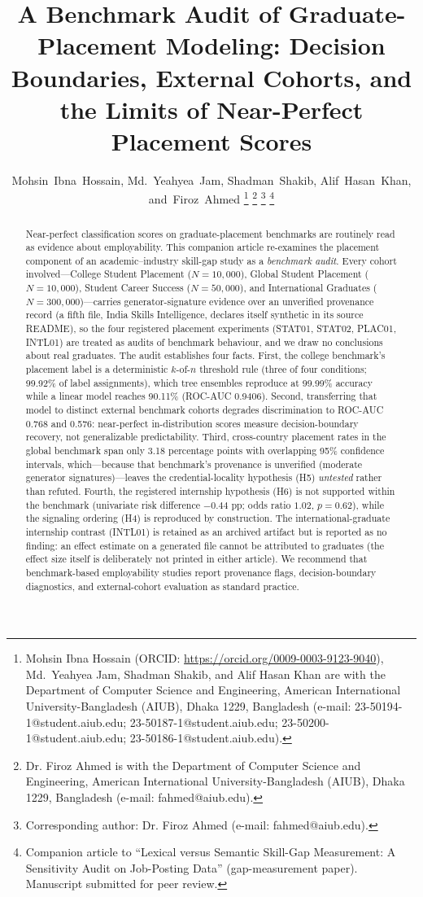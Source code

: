 \documentclass[journal]{IEEEtran}
\title{A Benchmark Audit of Graduate-Placement Modeling: Decision Boundaries, External Cohorts, and the Limits of Near-Perfect Placement Scores}
\author{Mohsin~Ibna~Hossain,
        Md.~Yeahyea~Jam,
        Shadman~Shakib,
        Alif~Hasan~Khan,
        and~Firoz~Ahmed%
\thanks{Mohsin Ibna Hossain (ORCID: \url{https://orcid.org/0009-0003-9123-9040}), Md.~Yeahyea Jam, Shadman Shakib, and Alif Hasan Khan are with the Department of Computer Science and Engineering, American International University-Bangladesh (AIUB), Dhaka 1229, Bangladesh (e-mail: 23-50194-1@student.aiub.edu; 23-50187-1@student.aiub.edu; 23-50200-1@student.aiub.edu; 23-50186-1@student.aiub.edu).}%
\thanks{Dr. Firoz Ahmed is with the Department of Computer Science and Engineering, American International University-Bangladesh (AIUB), Dhaka 1229, Bangladesh (e-mail: fahmed@aiub.edu).}%
\thanks{Corresponding author: Dr. Firoz Ahmed (e-mail: fahmed@aiub.edu).}%
\thanks{Companion article to ``Lexical versus Semantic Skill-Gap Measurement: A Sensitivity Audit on Job-Posting Data'' (gap-measurement paper). Manuscript submitted for peer review.}
}
\begin{document}
\maketitle

\begin{abstract}
Near-perfect classification scores on graduate-placement benchmarks are routinely read as evidence about employability. This companion article re-examines the placement component of an academic--industry skill-gap study as a \textit{benchmark audit}. Every cohort involved---College Student Placement ($N = 10{,}000$), Global Student Placement ($N = 10{,}000$), Student Career Success ($N = 50{,}000$), and International Graduates ($N = 300{,}000$)---carries generator-signature evidence over an unverified provenance record (a fifth file, India Skills Intelligence, declares itself synthetic in its source README), so the four registered placement experiments (STAT01, STAT02, PLAC01, INTL01) are treated as audits of benchmark behaviour, and we draw no conclusions about real graduates. The audit establishes four facts. First, the college benchmark's placement label is a deterministic $k$-of-$n$ threshold rule (three of four conditions; 99.92\% of label assignments), which tree ensembles reproduce at 99.99\% accuracy while a linear model reaches 90.11\% (ROC-AUC 0.9406). Second, transferring that model to distinct external benchmark cohorts degrades discrimination to ROC-AUC 0.768 and 0.576: near-perfect in-distribution scores measure decision-boundary recovery, not generalizable predictability. Third, cross-country placement rates in the global benchmark span only 3.18 percentage points with overlapping 95\% confidence intervals, which---because that benchmark's provenance is unverified (moderate generator signatures)---leaves the credential-locality hypothesis (H5) \textit{untested} rather than refuted. Fourth, the registered internship hypothesis (H6) is not supported within the benchmark (univariate risk difference $-0.44$ pp; odds ratio $1.02$, $p = 0.62$), while the signaling ordering (H4) is reproduced by construction. The international-graduate internship contrast (INTL01) is retained as an archived artifact but is reported as no finding: an effect estimate on a generated file cannot be attributed to graduates (the effect size itself is deliberately not printed in either article). We recommend that benchmark-based employability studies report provenance flags, decision-boundary diagnostics, and external-cohort evaluation as standard practice.
\end{abstract}
\end{document}
